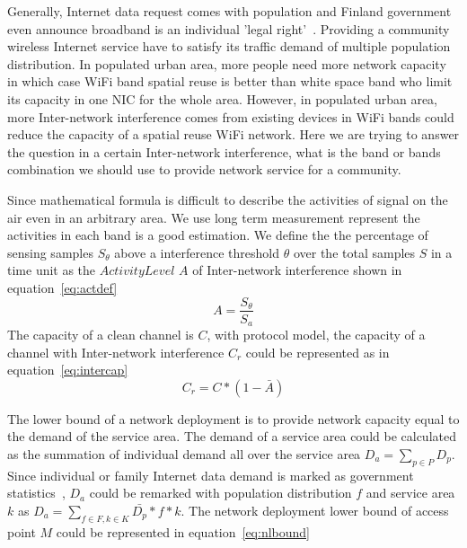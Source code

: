 Generally, Internet data request comes with population and Finland government even announce 
broadband is an individual 'legal right'~\cite{bbcfinland,rosston2011household}. 
Providing a community wireless Internet service have to satisfy its traffic demand 
of multiple population distribution. In populated urban area, more people need more 
network capacity in which case WiFi band spatial reuse is better than white space band 
who limit its capacity in one NIC for the whole area. However, in populated urban area, 
more Inter-network interference comes from existing devices in WiFi
bands could reduce the capacity of a spatial reuse WiFi network. 
Here we are trying to answer the question in a certain Inter-network interference,
what is the band or bands combination we should use to provide network service
 for a community.
%	  

Since mathematical formula is difficult to describe the activities of signal on the air even in an arbitrary area.
We use long term measurement represent the activities in each band is a good
estimation. We define the the percentage of sensing samples $S_\theta$ above a 
interference threshold $\theta$ over the total samples $S$ in a time unit as the 
{\it $Activity Level$} $A$ of Inter-network interference shown in equation~\ref{eq:actdef}
\begin{equation}
\label{eq:actdef}
A=\frac{S_\theta}{S_a}
\end{equation}
The capacity of a clean channel is $C$, with protocol model, the capacity of a channel with Inter-network
 interference $C_r$ could be represented as in equation~\ref{eq:intercap}
\begin{equation}
\label{eq:intercap}
C_r=C*(1-\bar{A})
\end{equation}

The lower bound of a network deployment is to provide network capacity equal to the demand of the service 
area. The demand of a service area could be calculated as the summation of individual demand all over 
the service area $D_a=\sum_{p\in P}D_p$. Since individual or family Internet data demand is marked as government 
statistics~\cite{rosston2011household}, $D_a$ could be remarked with population distribution $f$ and service area $k$ as 
$D_a=\sum_{f \in F,k \in K}\bar{D_p}*f*k$. The network deployment lower bound of access point $M$ could be 
represented in equation~\ref{eq:nlbound}

